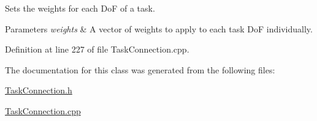 Sets the weights for each DoF of a task. 
\begin{DoxyParams}{Parameters}
{\em weights} & A vector of weights to apply to each task DoF individually. \\
\hline
\end{DoxyParams}


Definition at line 227 of file Task\+Connection.\+cpp.



The documentation for this class was generated from the following files\+:\begin{DoxyCompactItemize}
\item 
\hyperlink{TaskConnection_8h}{Task\+Connection.\+h}\item 
\hyperlink{TaskConnection_8cpp}{Task\+Connection.\+cpp}\end{DoxyCompactItemize}
